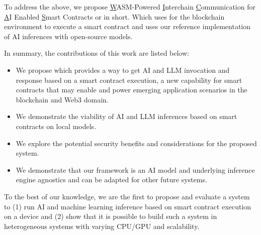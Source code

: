 To address the above, we propose \underline{W}ASM-Powered \underline{I}nterchain \underline{C}ommunication for \underline{A}I Enabled \underline{S}mart Contracts or \sln{} in short. Which uses \cite{kwon2019cosmos} for the blockchain environment to execute a smart contract and uses our reference implementation of AI inferences with open-source models. 

In summary, the contributions of this work are listed below:
\begin{tcolorbox}[colback=green!5!white,colframe=green!75!black]
\begin{itemize}
    \item We propose \sln{} which provides a way to get AI and LLM invocation and response based on a smart contract execution, a new capability for smart contracts that may enable and power emerging application scenarios in the blockchain and Web3 domain. 
    \item We demonstrate the viability of AI and LLM inferences based on smart contracts on local models.
    \item We explore the potential security benefits and considerations for the proposed system.
    \item We demonstrate that our framework is an AI model and underlying inference engine agnostics and can be adapted for other future systems.
\end{itemize}
\end{tcolorbox}


To the best of our knowledge, we are the first to propose and evaluate a system to (1) run AI and machine learning inference based on smart contract execution on a device and (2) show that it is possible to build such a system in heterogeneous systems with varying CPU/GPU and scalability.